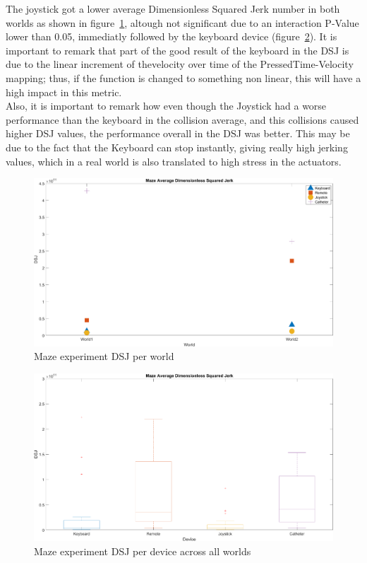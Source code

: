 The joystick got a lower average Dimensionless Squared Jerk number in both worlds as shown in figure~\ref{img:mazeAvgDsj}, altough not significant due to an interaction P-Value lower than 0.05, immediatly followed by the keyboard device (figure~\ref{img:mazeDsj}). It is important to remark that part of the good result of the keyboard in the DSJ is due to the linear increment of thevelocity over time of the PressedTime-Velocity mapping; thus, if the function is changed to something non linear, this will have a high impact in this metric.\\

Also, it is important to remark how even though the Joystick had a worse performance than the keyboard in the collision average, and this collisions caused higher DSJ values, the performance overall in the DSJ was better. This may be due to the fact that the Keyboard can stop instantly, giving really high jerking values, which in a real world is also translated to high stress in the actuators.\\

\begin{figure}[ht]
   \centering
   \includegraphics[width=1.0\textwidth]{img/maze/mazeAvgDsj.png}
   \caption{Maze experiment DSJ per world}
   \label{img:mazeAvgDsj}
\end{figure}

\begin{figure}[ht]
   \centering
   \includegraphics[width=1.0\textwidth]{img/maze/mazeDsj.png}
   \caption{Maze experiment DSJ per device across all worlds}
   \label{img:mazeDsj}
\end{figure}
\clearpage

